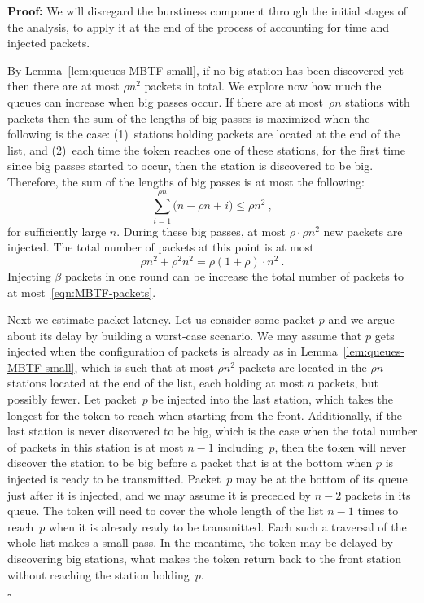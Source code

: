 \documentclass[11pt]{article}
\newcommand{\qed}{\hfill $\square$}
\newenvironment{proof}{\noindent\textbf{Proof: }}{\qed \smallbreak}
\begin{document}
\begin{proof}
We will disregard the burstiness component through the initial stages of the analysis, to apply it at the end of the process of accounting for time and injected packets.

By Lemma~\ref{lem:queues-MBTF-small},  if no big station has been discovered yet then there are at most  $\rho n^2$ packets in total.
We explore now how much the queues can increase when big passes occur.
If there are at most~$\rho n$ stations with packets then the sum of the lengths of big passes is maximized when the following is the case: (1)~stations holding packets are located at the end of the list, and   (2)~each time the token reaches one of these stations, for the first time since big passes started to occur, then the station is discovered to be big.
Therefore, the sum of the lengths of big passes  is at most the following:
\[
\sum_{i=1}^{\rho n} \bigl(n-\rho n+i\bigr)
\le
\rho n^2 
\ ,
\]
for sufficiently large $n$.
During these big passes, at most $\rho\cdot \rho n^2$ new packets are injected. 
The total number of packets at this point is at most
\[
\rho n^2 + \rho^2 n^2 = \rho (1+\rho) \cdot n^2
\ .
\]
Injecting $\beta$ packets in one round can be increase the total number of packets to at most~\eqref{eqn:MBTF-packets}.

Next we estimate packet latency.
Let us consider some packet $p$ and we argue about its delay by building a worst-case scenario.
We may assume that $p$ gets injected when the configuration of packets is already as in Lemma~\ref{lem:queues-MBTF-small}, which is such that at most $\rho  n^2 $ packets are located  in the $\rho  n$ stations located at the end of the list, each holding at most  $n$ packets, but possibly fewer.
Let  packet~$p$ be injected into the last station, which takes the longest for the token to reach when starting from the front.
Additionally, if the last station is never discovered to be big, which is the case when the total number of packets in this station is at most $n-1$ including~$p$, then the token will never discover the station to be big before a packet that is at the bottom when $p$ is injected is ready to be transmitted.
Packet~$p$ may be at the bottom of its queue just after it is injected, and we may assume it is preceded  by $n-2$ packets in its queue.
The token will need to cover the whole length of the list $n-1$ times to reach~$p$ when it is already ready to be transmitted.
Each such a traversal of the whole list makes a small pass. 
In the meantime, the token may be delayed by discovering big stations, what makes the token return back to the front station without reaching the station holding~$p$.


\end{proof}
\end{document}
